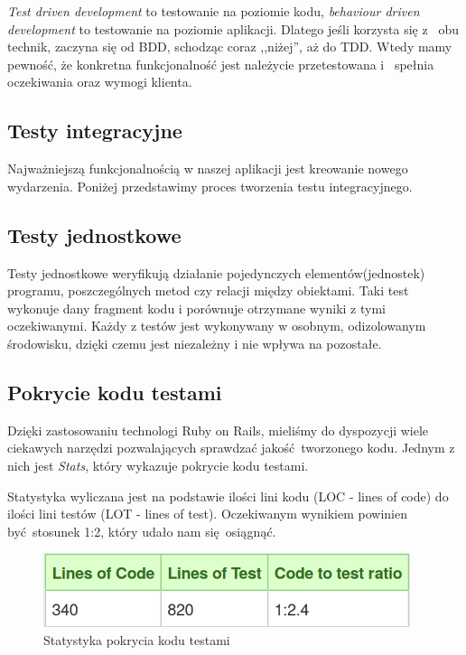 \begin{itemize}
        \emph{Test driven development} to testowanie na poziomie kodu, \emph{behaviour driven development} to testowanie na poziomie aplikacji. Dlatego jeśli korzysta się z~ obu technik, zaczyna się od BDD, schodząc coraz ,,niżej'', aż do TDD. Wtedy mamy pewność, że konkretna funkcjonalność jest należycie przetestowana i~ spełnia oczekiwania oraz wymogi klienta.
    \end{itemize}

  \subsection{Testy integracyjne}
    Najważniejszą funkcjonalnością w naszej aplikacji jest kreowanie nowego wydarzenia. Poniżej przedstawimy proces tworzenia testu integracyjnego.

    
  \subsection{Testy jednostkowe}
    Testy jednostkowe weryfikują działanie pojedynczych elementów(jednostek) programu, poszczególnych metod czy relacji między obiektami. Taki test wykonuje dany fragment kodu i porównuje otrzymane wyniki z tymi oczekiwanymi. Każdy z testów jest wykonywany w osobnym, odizolowanym środowisku, dzięki czemu jest niezależny i nie wpływa na pozostałe.

    
  \clearpage
  \subsection{Pokrycie kodu testami}
    Dzięki zastosowaniu technologi Ruby on Rails, mieliśmy do dyspozycji wiele ciekawych narzędzi pozwalających sprawdzać jakość tworzonego kodu. Jednym z~ nich jest \emph{Stats}, który wykazuje pokrycie kodu testami.

    Statystyka wyliczana jest na podstawie ilości lini kodu (LOC - lines of code) do ilości lini testów (LOT - lines of test). Oczekiwanym wynikiem powinien być stosunek 1:2, który udało nam się osiągnąć.
    \begin{figure}[h]
      \centering
      \includegraphics[scale=0.5]{images/loc_table.png}
      \caption{Statystyka pokrycia kodu testami}
    \end{figure}

